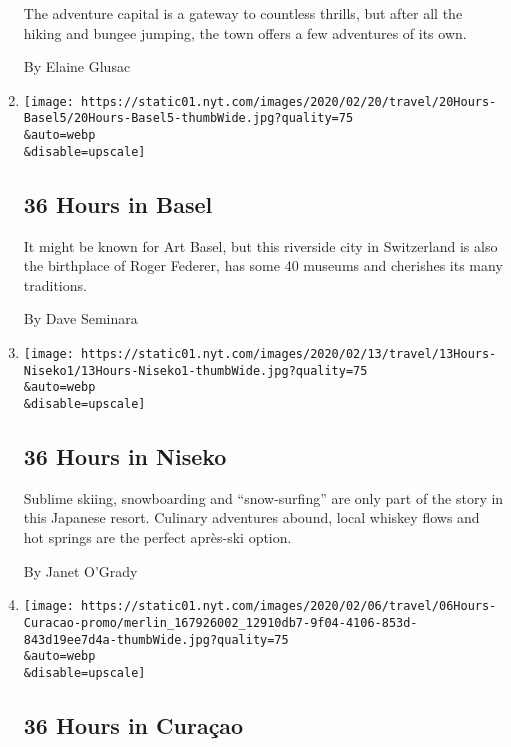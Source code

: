 \begin{enumerate}
  The adventure capital is a gateway to countless thrills, but after all
  the hiking and bungee jumping, the town offers a few adventures of its
  own.

  By Elaine Glusac
\item
  \href{/2020/02/20/travel/what-to-do-36-hours-in-switzerland.html}{}

  \texttt{[image: https://static01.nyt.com/images/2020/02/20/travel/20Hours-Basel5/20Hours-Basel5-thumbWide.jpg?quality=75\\\&auto=webp\\\&disable=upscale]}

  \hypertarget{36-hours-in-basel}{%
  \subsection{36 Hours in Basel}\label{36-hours-in-basel}}

  It might be known for Art Basel, but this riverside city in
  Switzerland is also the birthplace of Roger Federer, has some 40
  museums and cherishes its many traditions.

  By Dave Seminara
\item
  \href{/2020/02/13/travel/what-to-do-36-hours-in-niseko-japan.html}{}

  \texttt{[image: https://static01.nyt.com/images/2020/02/13/travel/13Hours-Niseko1/13Hours-Niseko1-thumbWide.jpg?quality=75\\\&auto=webp\\\&disable=upscale]}

  \hypertarget{36-hours-in-niseko}{%
  \subsection{36 Hours in Niseko}\label{36-hours-in-niseko}}

  Sublime skiing, snowboarding and ``snow-surfing'' are only part of the
  story in this Japanese resort. Culinary adventures abound, local
  whiskey flows and hot springs are the perfect après-ski option.

  By Janet O'Grady
\item
  \href{/2020/02/06/travel/what-to-do-36-hours-in-curacao.html}{}

  \texttt{[image: https://static01.nyt.com/images/2020/02/06/travel/06Hours-Curacao-promo/merlin\_167926002\_12910db7-9f04-4106-853d-843d19ee7d4a-thumbWide.jpg?quality=75\\\&auto=webp\\\&disable=upscale]}

  \hypertarget{36-hours-in-curauxe7ao}{%
  \subsection{36 Hours in Curaçao}\label{36-hours-in-curauxe7ao}}


\end{enumerate}
